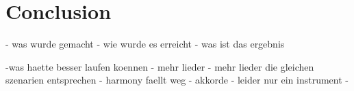 \section{Conclusion}
\label{conc}



- was wurde gemacht 
- wie wurde es erreicht
- was ist das ergebnis 

-was haette besser laufen koennen
  - mehr lieder
  - mehr lieder die gleichen szenarien entsprechen
  - harmony faellt weg
  - akkorde 
  - leider nur ein instrument
  - 



%
%


